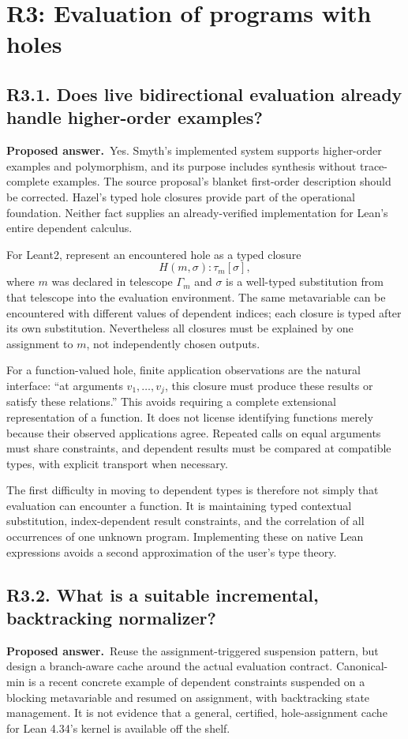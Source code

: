 \documentclass[11pt,a4paper]{article}
\newcommand{\question}[2]{\subsection{#1. #2}\label{q:#1}}
\newcommand{\answer}{\textbf{Proposed answer.}\ }
\theoremstyle{remark}
\begin{document}
\section{R3: Evaluation of programs with holes}
\label{sec:r3}

\question{R3.1}{Does live bidirectional evaluation already handle higher-order examples?}

\answer Yes. Smyth's implemented system supports higher-order examples and
polymorphism, and its purpose includes synthesis without trace-complete
examples. The source proposal's blanket first-order description should be
corrected. Hazel's typed hole closures provide part of the operational
foundation. Neither fact supplies an already-verified implementation for
Lean's entire dependent calculus.\cite{smyth,hazel}

For Leant2, represent an encountered hole as a typed closure
\[
 H(m,\sigma):\tau_m[\sigma],
\]
where $m$ was declared in telescope $\Gamma_m$ and $\sigma$ is a well-typed
substitution from that telescope into the evaluation environment. The same
metavariable can be encountered with different values of dependent indices;
each closure is typed after its own substitution. Nevertheless all closures
must be explained by one assignment to $m$, not independently chosen outputs.

For a function-valued hole, finite application observations are the natural
interface: ``at arguments $v_1,\ldots,v_j$, this closure must produce these
results or satisfy these relations.'' This avoids requiring a complete
extensional representation of a function. It does not license identifying
functions merely because their observed applications agree. Repeated calls
on equal arguments must share constraints, and dependent results must be
compared at compatible types, with explicit transport when necessary.

The first difficulty in moving to dependent types is therefore not simply
that evaluation can encounter a function. It is maintaining typed contextual
substitution, index-dependent result constraints, and the correlation of all
occurrences of one unknown program. Implementing these on native Lean
expressions avoids a second approximation of the user's type theory.

\question{R3.2}{What is a suitable incremental, backtracking normalizer?}

\answer Reuse the assignment-triggered suspension pattern, but design a
branch-aware cache around the actual evaluation contract. Canonical-min is
a recent concrete example of dependent constraints suspended on a blocking
metavariable and resumed on assignment, with backtracking state management.
It is not evidence that a general, certified, hole-assignment cache for
Lean 4.34's kernel is available off the shelf.\cite{canonicalmin}
\end{document}
